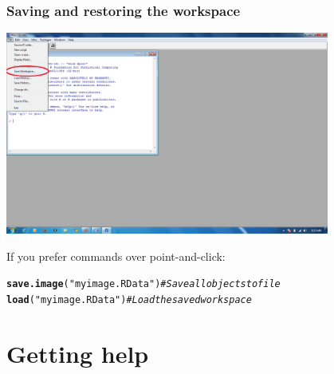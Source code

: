 \documentclass[color=usenames,dvipsnames]{beamer}\usepackage[]{graphicx}\usepackage[]{color}
\makeatletter
\newcommand{\hlstr}[1]{\textcolor[rgb]{0.192,0.494,0.8}{#1}}%
\newcommand{\hlcom}[1]{\textcolor[rgb]{0.678,0.584,0.686}{\textit{#1}}}%
\newcommand{\hlstd}[1]{\textcolor[rgb]{0.345,0.345,0.345}{#1}}%
\newcommand{\hlkwd}[1]{\textcolor[rgb]{0.737,0.353,0.396}{\textbf{#1}}}%
\newenvironment{kframe}{%
 \def\at@end@of@kframe{}%
 \ifinner\ifhmode%
  \def\at@end@of@kframe{\end{minipage}}%
  \begin{minipage}{\columnwidth}%
 \fi\fi%
 \def\FrameCommand##1{\hskip\@totalleftmargin \hskip-\fboxsep
 \colorbox{shadecolor}{##1}\hskip-\fboxsep
     \hskip-\linewidth \hskip-\@totalleftmargin \hskip\columnwidth}%
 \MakeFramed {\advance\hsize-\width
   \@totalleftmargin\z@ \linewidth\hsize
   \@setminipage}}%
 {\par\unskip\endMakeFramed%
 \at@end@of@kframe}
\newenvironment{knitrout}{}{} %
\makeatother
\begin{document}
\begin{frame}[fragile]
  \frametitle{Saving and restoring the workspace}
  \begin{center}
    \includegraphics[width=0.8\textwidth]{figs/save-workspace}
  \end{center}
  \pause
If you prefer commands over point-and-click:
\begin{knitrout}
\color{fgcolor}\begin{kframe}
\begin{alltt}
\hlkwd{save.image}\hlstd{(}\hlstr{"myimage.RData"}\hlstd{)} \hlcom{# Save all objects to file}
\hlkwd{load}\hlstd{(}\hlstr{"myimage.RData"}\hlstd{)}       \hlcom{# Load the saved workspace}
\end{alltt}
\end{kframe}
\end{knitrout}
\end{frame}




\section{Getting help}
\end{document}
